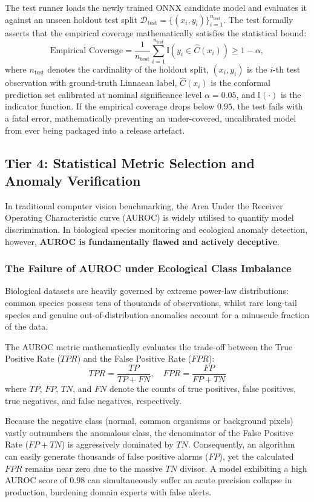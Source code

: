 The test runner loads the newly trained ONNX candidate model and evaluates it against an unseen holdout test split $\mathcal{D}_{\text{test}} = \{(x_i, y_i)\}_{i=1}^{n_{\text{test}}}$. The test formally asserts that the empirical coverage mathematically satisfies the statistical bound:
\[
\text{Empirical Coverage} = \frac{1}{n_{\text{test}}} \sum_{i=1}^{n_{\text{test}}} \mathbb{I}\left(y_i \in \hat{C}(x_i)\right) \ge 1 - \alpha,
\]
where $n_{\text{test}}$ denotes the cardinality of the holdout split, $(x_i, y_i)$ is the $i$-th test observation with ground-truth Linnaean label, $\hat{C}(x_i)$ is the conformal prediction set calibrated at nominal significance level $\alpha = 0.05$, and $\mathbb{I}(\cdot)$ is the indicator function. If the empirical coverage drops below $0.95$, the test fails with a fatal error, mathematically preventing an under-covered, uncalibrated model from ever being packaged into a release artefact.

\subsection{Tier 4: Statistical Metric Selection and Anomaly Verification}
In traditional computer vision benchmarking, the Area Under the Receiver Operating Characteristic curve (AUROC) is widely utilised to quantify model discrimination. In biological species monitoring and ecological anomaly detection, however, \textbf{AUROC is fundamentally flawed and actively deceptive}.

\subsubsection{The Failure of AUROC under Ecological Class Imbalance}
Biological datasets are heavily governed by extreme power-law distributions: common species possess tens of thousands of observations, whilst rare long-tail species and genuine out-of-distribution anomalies account for a minuscule fraction of the data.

The AUROC metric mathematically evaluates the trade-off between the True Positive Rate ($TPR$) and the False Positive Rate ($FPR$):
\[
TPR = \frac{TP}{TP + FN}, \quad FPR = \frac{FP}{FP + TN}
\]
where $TP$, $FP$, $TN$, and $FN$ denote the counts of true positives, false positives, true negatives, and false negatives, respectively.

Because the negative class (normal, common organisms or background pixels) vastly outnumbers the anomalous class, the denominator of the False Positive Rate ($FP + TN$) is aggressively dominated by $TN$. Consequently, an algorithm can easily generate thousands of false positive alarms ($FP$), yet the calculated $FPR$ remains near zero due to the massive $TN$ divisor. A model exhibiting a high AUROC score of $0.98$ can simultaneously suffer an acute precision collapse in production, burdening domain experts with false alerts.

